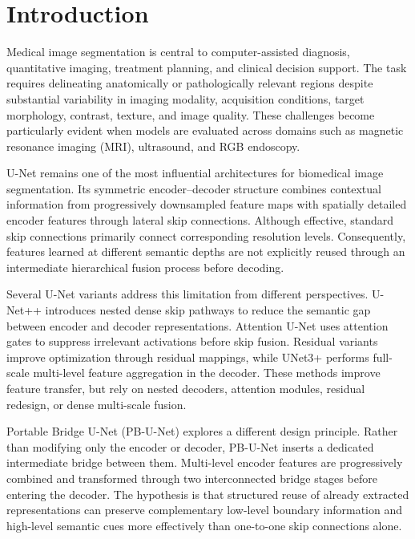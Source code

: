 \documentclass[11pt]{article}
\begin{document}
\section{Introduction}
Medical image segmentation is central to computer-assisted diagnosis, quantitative imaging, treatment planning, and clinical decision support. The task requires delineating anatomically or pathologically relevant regions despite substantial variability in imaging modality, acquisition conditions, target morphology, contrast, texture, and image quality. These challenges become particularly evident when models are evaluated across domains such as magnetic resonance imaging (MRI), ultrasound, and RGB endoscopy.

U-Net \citep{ronneberger2015unet} remains one of the most influential architectures for biomedical image segmentation. Its symmetric encoder--decoder structure combines contextual information from progressively downsampled feature maps with spatially detailed encoder features through lateral skip connections. Although effective, standard skip connections primarily connect corresponding resolution levels. Consequently, features learned at different semantic depths are not explicitly reused through an intermediate hierarchical fusion process before decoding.

Several U-Net variants address this limitation from different perspectives. U-Net++ \citep{zhou2018unetpp} introduces nested dense skip pathways to reduce the semantic gap between encoder and decoder representations. Attention U-Net \citep{oktay2018attention} uses attention gates to suppress irrelevant activations before skip fusion. Residual variants improve optimization through residual mappings, while UNet3+ \citep{huang2020unet3plus} performs full-scale multi-level feature aggregation in the decoder. These methods improve feature transfer, but rely on nested decoders, attention modules, residual redesign, or dense multi-scale fusion.

Portable Bridge U-Net (PB-U-Net) explores a different design principle. Rather than modifying only the encoder or decoder, PB-U-Net inserts a dedicated intermediate bridge between them. Multi-level encoder features are progressively combined and transformed through two interconnected bridge stages before entering the decoder. The hypothesis is that structured reuse of already extracted representations can preserve complementary low-level boundary information and high-level semantic cues more effectively than one-to-one skip connections alone.
\end{document}
